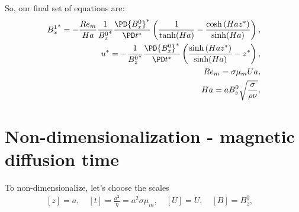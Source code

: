 \documentclass[11pt]{article}
\begin{document}
So, our final set of equations are:
\begin{equation}\begin{aligned}
{B_x^1}^* = - \frac{Re_m}{Ha} \frac{1}{{B_z^0}^*} \frac{\PD {B_x^0}^*}{\PD t^*} \left( \frac{1}{\tanh(Ha)} -  \frac{\cosh \left(Ha z^* \right)}{\sinh(Ha)}\right), \\
u^*       = - \frac{1}{{B_z^0}^*} \frac{\PD {B_x^0}^*}{\PD t^*} \left( \frac{\sinh\left(Ha z^* \right)}{\sinh(Ha)} - z^* \right), \\
Re_m = \sigma \mu_m U a, \\
Ha = a B_z^0 \sqrt{\frac{\sigma}{\rho \nu}}, \\
\end{aligned} \end{equation}

\section{Non-dimensionalization - magnetic diffusion time}
To non-dimensionalize, let's choose the scales
\begin{equation}\begin{aligned}
[z] = a,  \quad
[t] = \frac{a^2}{\eta} = a^2 \sigma \mu_m,  \quad
[U] = U,  \quad
[B] = B_z^0,  \quad
\end{aligned} \end{equation}
\end{document}

